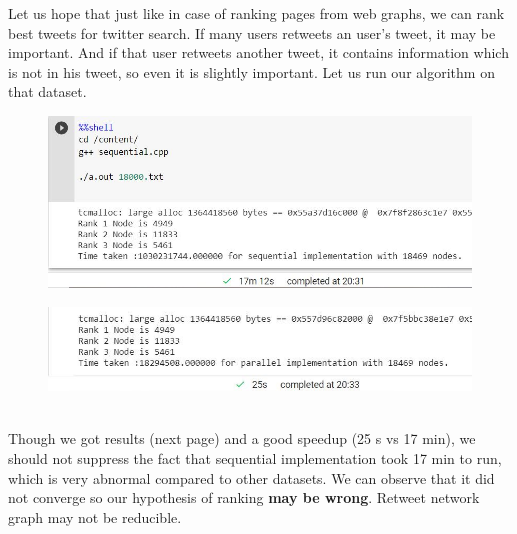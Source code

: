 \documentclass[a4paper]{article}
\begin{document}
Let us hope that just like in case of ranking pages from web graphs, we can rank best tweets for twitter search. If many users retweets an user's tweet, it may be important. And if that user retweets another tweet, it contains information which is not in his tweet, so even it is slightly important. Let us run our algorithm on that dataset.
\begin{figure}[h]
    \begin{center}
    \includegraphics[width=1\textwidth]{PageRank/img/Capture6.JPG}
    \end{center}
\end{figure}
\begin{figure}[h]
    \begin{center}
    \includegraphics[width=1\textwidth]{PageRank/img/Capture7.JPG}
    \end{center}
\end{figure}
\\

Though we got results (next page) and a good speedup (25 s vs 17 min), we should not suppress the fact that sequential implementation took 17 min to run, which is very abnormal compared to other datasets. We can observe that it did not converge so our hypothesis of ranking \textbf{may be wrong}. Retweet network graph may not be reducible. 
\end{document}
